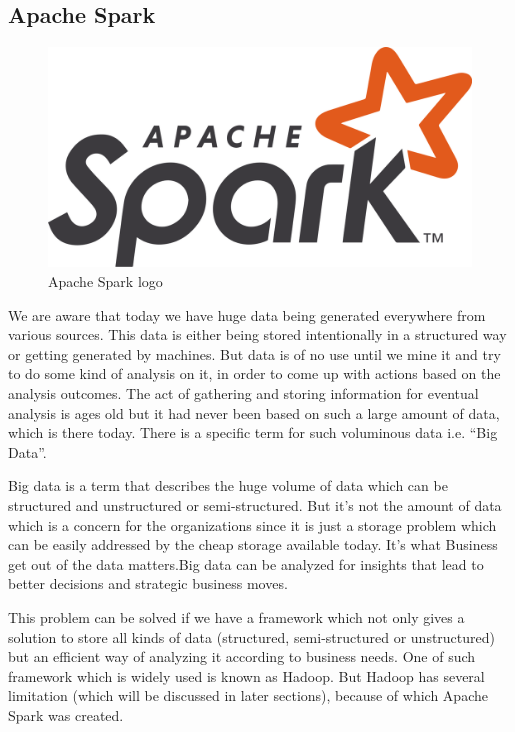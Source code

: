 \subsection{Apache Spark}
\begin{figure}[h]
	\centering \includegraphics[scale=0.2]{input/images/spark.png}
	\caption{Apache Spark logo}
\end{figure}
We are aware that today we have huge data being generated everywhere from various sources. This data is either being stored intentionally in a structured way or getting generated by machines. But data is of no use until we mine it and try to do some kind of analysis on it, in order to come up with actions based on the analysis outcomes. The act of gathering and storing information for eventual analysis is ages old but it had never been based on such a large amount of data, which is there today. There is a specific term for such voluminous data i.e. “Big Data”.

Big data is a term that describes the huge volume of data which can be structured and unstructured or semi-structured. But it’s not the amount of data which is a concern for the organizations since it is just a storage problem which can be easily addressed by the cheap storage available today. It’s what Business get out of the data matters.Big data can be analyzed for insights that lead to better decisions and strategic business moves.

This problem can be solved if we have a framework which not only gives a solution to store all kinds of data (structured, semi-structured or unstructured) but an efficient way of analyzing it according to business needs. One of such framework which is widely used is known as Hadoop. But Hadoop has several limitation (which will be discussed in later sections), because of which Apache Spark was created.

